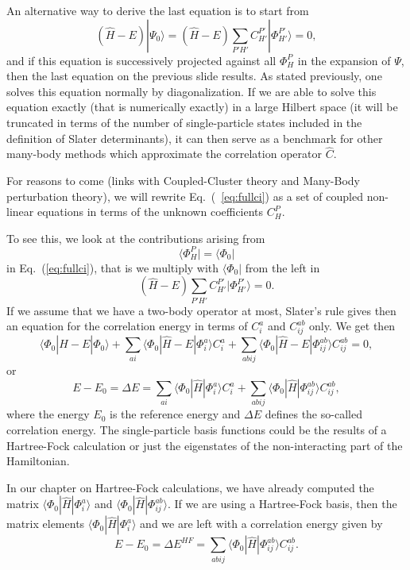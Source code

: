 \documentclass[graybox,sectrefs,envcountresetchap,open=right]{svmonodo}
\begin{document}
An alternative way to derive the last equation is to start from 
\[
(\hat{H} -E)|\Psi_0\rangle = (\hat{H} -E)\sum_{P'H'}C_{H'}^{P'}|\Phi_{H'}^{P'} \rangle=0, 
\]
and if this equation is successively projected against all $\Phi_H^P$ in the expansion of $\Psi$, then the last equation on the previous slide
results.   As stated previously, one solves this equation normally by diagonalization. If we are able to solve this equation exactly (that is
numerically exactly) in a large Hilbert space (it will be truncated in terms of the number of single-particle states included in the definition
of Slater determinants), it can then serve as a benchmark for other many-body methods which approximate the correlation operator
$\hat{C}$.  


For reasons to come (links with Coupled-Cluster theory and Many-Body perturbation theory), 
we will rewrite Eq.~(~\ref{eq:fullci}) as a set of coupled non-linear equations in terms of the unknown coefficients $C_H^P$. 

To see this, we look at the contributions arising from 
\[
\langle \Phi_H^P | = \langle \Phi_0|
\]
in  Eq.~(\ref{eq:fullci}), that is we multiply with $\langle \Phi_0 |$
from the left in 
\[
(\hat{H} -E)\sum_{P'H'}C_{H'}^{P'}|\Phi_{H'}^{P'} \rangle=0. 
\]
If we assume that we have a two-body operator at most, Slater's rule gives then an equation for the 
correlation energy in terms of $C_i^a$ and $C_{ij}^{ab}$ only.  We get then
\[
\langle \Phi_0 | \hat{H} -E| \Phi_0\rangle + \sum_{ai}\langle \Phi_0 | \hat{H} -E|\Phi_{i}^{a} \rangle C_{i}^{a}+
\sum_{abij}\langle \Phi_0 | \hat{H} -E|\Phi_{ij}^{ab} \rangle C_{ij}^{ab}=0,
\]
or 
\[
E-E_0 =\Delta E=\sum_{ai}\langle \Phi_0 | \hat{H}|\Phi_{i}^{a} \rangle C_{i}^{a}+
\sum_{abij}\langle \Phi_0 | \hat{H}|\Phi_{ij}^{ab} \rangle C_{ij}^{ab},
\]
where the energy $E_0$ is the reference energy and $\Delta E$ defines the so-called correlation energy.
The single-particle basis functions  could be the results of a Hartree-Fock calculation or just the eigenstates of the non-interacting part of the Hamiltonian. 

In our chapter on Hartree-Fock calculations, 
we have already computed the matrix $\langle \Phi_0 | \hat{H}|\Phi_{i}^{a}\rangle $ and $\langle \Phi_0 | \hat{H}|\Phi_{ij}^{ab}\rangle$.  If we are using a Hartree-Fock basis, then the matrix elements
$\langle \Phi_0 | \hat{H}|\Phi_{i}^{a}\rangle $ and we are left with a correlation energy given by
\[
E-E_0 =\Delta E^{HF}=\sum_{abij}\langle \Phi_0 | \hat{H}|\Phi_{ij}^{ab} \rangle C_{ij}^{ab}. 
\]
\end{document}
